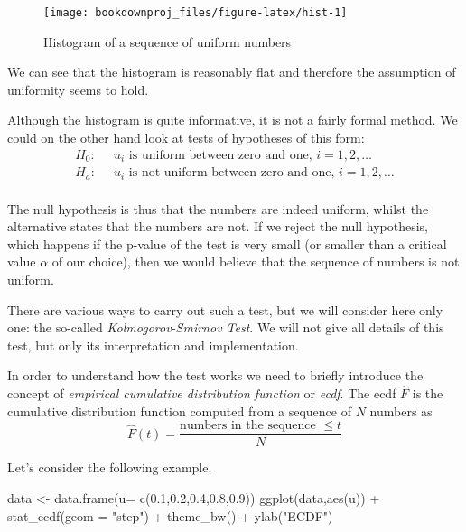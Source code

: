 \documentclass[
]{book}
\newenvironment{Shaded}{\begin{snugshade}}{\end{snugshade}}
\newcommand{\AttributeTok}[1]{\textcolor[rgb]{0.77,0.63,0.00}{#1}}
\newcommand{\FloatTok}[1]{\textcolor[rgb]{0.00,0.00,0.81}{#1}}
\newcommand{\FunctionTok}[1]{\textcolor[rgb]{0.00,0.00,0.00}{#1}}
\newcommand{\NormalTok}[1]{#1}
\newcommand{\OtherTok}[1]{\textcolor[rgb]{0.56,0.35,0.01}{#1}}
\newcommand{\SpecialCharTok}[1]{\textcolor[rgb]{0.00,0.00,0.00}{#1}}
\newcommand{\StringTok}[1]{\textcolor[rgb]{0.31,0.60,0.02}{#1}}
\begin{document}
\begin{figure}

{\centering \texttt{[image: bookdownproj\_files/figure-latex/hist-1]} 

}

\caption{Histogram of a sequence of uniform numbers}\label{fig:hist}
\end{figure}

We can see that the histogram is reasonably flat and therefore the assumption of uniformity seems to hold.

Although the histogram is quite informative, it is not a fairly formal method. We could on the other hand look at tests of hypotheses of this form:
\begin{align*}
H_0: & \;\;u_i \mbox{ is uniform between zero and one, } i=1,2,\dots\\
H_a: & \;\;u_i \mbox{ is not uniform between zero and one, } i=1,2,\dots\\
\end{align*}

The null hypothesis is thus that the numbers are indeed uniform, whilst the alternative states that the numbers are not. If we reject the null hypothesis, which happens if the p-value of the test is very small (or smaller than a critical value \(\alpha\) of our choice), then we would believe that the sequence of numbers is not uniform.

There are various ways to carry out such a test, but we will consider here only one: the so-called \emph{Kolmogorov-Smirnov Test}. We will not give all details of this test, but only its interpretation and implementation.

In order to understand how the test works we need to briefly introduce the concept of \emph{empirical cumulative distribution function} or \emph{ecdf}. The ecdf \(\hat{F}\) is the cumulative distribution function computed from a sequence of \(N\) numbers as
\[
\hat{F}(t)= \frac{\mbox{numbers in the sequence }\leq t}{N}
\]

Let's consider the following example.

\begin{Shaded}
\begin{Highlighting}[]
\NormalTok{data }\OtherTok{\textless{}{-}} \FunctionTok{data.frame}\NormalTok{(}\AttributeTok{u=} \FunctionTok{c}\NormalTok{(}\FloatTok{0.1}\NormalTok{,}\FloatTok{0.2}\NormalTok{,}\FloatTok{0.4}\NormalTok{,}\FloatTok{0.8}\NormalTok{,}\FloatTok{0.9}\NormalTok{))}
\FunctionTok{ggplot}\NormalTok{(data,}\FunctionTok{aes}\NormalTok{(u)) }\SpecialCharTok{+} \FunctionTok{stat\_ecdf}\NormalTok{(}\AttributeTok{geom =} \StringTok{"step"}\NormalTok{) }\SpecialCharTok{+} \FunctionTok{theme\_bw}\NormalTok{() }\SpecialCharTok{+} \FunctionTok{ylab}\NormalTok{(}\StringTok{"ECDF"}\NormalTok{)}
\end{Highlighting}
\end{Shaded}
\end{document}
